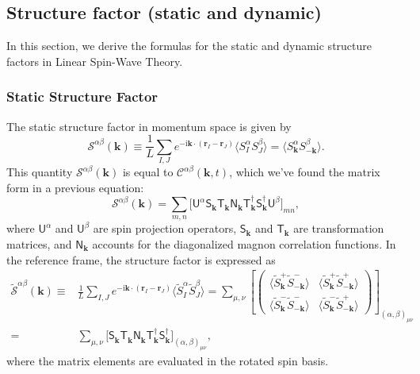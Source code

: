 \documentclass[aps, prx, nofootinbib, superscriptaddress]{revtex4-2}
\newcommand{\kvec}{\mathbf{k}}
\newcommand{\ri}{\mathrm{i}}
\begin{document}
\subsection{Structure factor (static and dynamic)}\label{subsec: Structure Factor}

In this section, we derive the formulas for the static and dynamic structure factors in Linear Spin-Wave Theory.

\subsubsection{Static Structure Factor}

The static structure factor in momentum space is given by
\begin{equation}
    \mathcal{S}^{\alpha\beta} (\kvec) 
    \equiv \frac{1}{L} 
    \sum_{I, J}
    e^{- \ri \kvec \cdot ( \mathbf{r}_{I} -  \mathbf{r}_{J} ) }
    \langle 
    S_{I}^{\alpha}
    S_{J}^{\beta} 
    \rangle 
    = \big\langle S^{\alpha}_{\kvec} S^{\beta}_{-\kvec} \big\rangle.
\end{equation}
This quantity $\mathcal{S}^{\alpha\beta} (\kvec)$ is equal to $\mathcal{C}^{\alpha\beta}(\kvec, t)$, which we've found the matrix form in a previous equation:
\begin{equation}
    \mathcal{S}^{\alpha\beta} (\kvec) = 
    \sum_{m,n} 
    \big[ \mathsf{U}^{\alpha} 
    \mathsf{S}_{\kvec}^{\phantom \dagger} 
    \mathsf{T}_{\kvec}^{\phantom \dagger} 
    \mathsf{N}_{\kvec}^{\phantom \dagger}
    \mathsf{T}_{\kvec}^{         \dagger}
    \mathsf{S}_{\kvec}^{         \dagger}
    \mathsf{U}^{\beta} \big]_{mn},
\end{equation}
where $\mathsf{U}^{\alpha}$ and $\mathsf{U}^{\beta}$ are spin projection operators, $\mathsf{S}_{\kvec}$ and $\mathsf{T}_{\kvec}$ are transformation matrices, and $\mathsf{N}_{\kvec}$ accounts for the diagonalized magnon correlation functions.
In the reference frame, the structure factor is expressed as
\begin{align*}
    \widetilde{\mathcal{S}}^{\alpha\beta} (\kvec) 
    \equiv &
    \frac{1}{L} 
    \sum_{I, J}
    e^{- \ri \kvec \cdot ( \mathbf{r}_{I} -  \mathbf{r}_{J} ) }
    \langle \widetilde{S}_{I}^{\alpha} \widetilde{S}_{J}^{\beta} \rangle 
    = 
    \sum_{\mu, \nu} 
    \left[
    \begin{pmatrix}
        \langle \widetilde{S}^{+}_{\kvec} \widetilde{S}^{-}_{-\kvec} \rangle &
        \langle \widetilde{S}^{+}_{\kvec} \widetilde{S}^{+}_{-\kvec} \rangle \\[0.25em]
        \langle \widetilde{S}^{-}_{\kvec} \widetilde{S}^{-}_{-\kvec} \rangle &
        \langle \widetilde{S}^{-}_{\kvec} \widetilde{S}^{+}_{-\kvec} \rangle
    \end{pmatrix} 
    \right]_{(\alpha, \beta)_{\mu\nu}}
    \\ = &
    \sum_{\mu, \nu} 
    \big[
    \mathsf{S}_{\kvec}^{\phantom \dagger} 
    \mathsf{T}_{\kvec}^{\phantom \dagger} 
    \mathsf{N}_{\kvec}^{\phantom \dagger}  
    \mathsf{T}_{\kvec}^{         \dagger}
    \mathsf{S}_{\kvec}^{         \dagger}
    \big]_{(\alpha, \beta)_{\mu\nu}},
\end{align*}
where the matrix elements are evaluated in the rotated spin basis.
\end{document}
